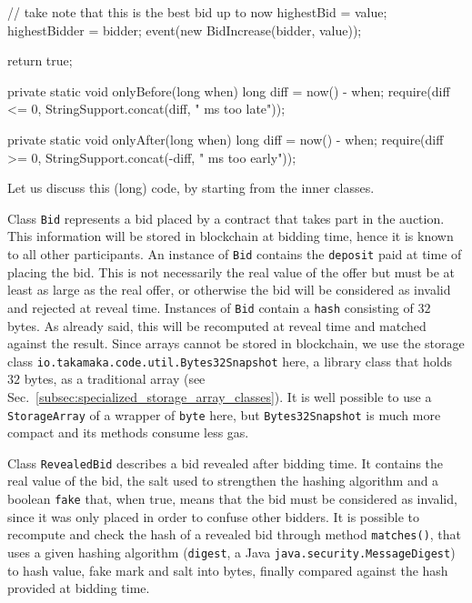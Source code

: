\begin{codebox}
\begin{javalst}
{{    // take note that this is the best bid up to now
    highestBid = value;
    highestBidder = bidder;
    event(new BidIncrease(bidder, value));

    return true;
  }

  private static void onlyBefore(long when) {
    long diff = now() - when;
    require(diff <= 0, StringSupport.concat(diff, " ms too late"));
  }

  private static void onlyAfter(long when) {
    long diff = now() - when;
    require(diff >= 0, StringSupport.concat(-diff, " ms too early"));
  }
}
\end{javalst}\end{codebox}

Let us discuss this (long) code, by starting from the inner classes.

Class \texttt{Bid} represents a bid placed by a contract that takes part in the auction.
This information will be stored in blockchain at bidding time, hence
it is known to all other participants. An instance of \texttt{Bid} contains
the \texttt{deposit} paid at time of placing the bid. This is not necessarily
the real value of the offer but must be at least as large as the real offer,
or otherwise the bid will be considered as invalid and rejected at reveal time. Instances
of \texttt{Bid} contain a \texttt{hash} consisting of $32$ bytes. As already said, this will
be recomputed at reveal time and matched against the result.
Since arrays cannot be stored in blockchain, we use the storage class
\texttt{io.takamaka.code.util.Bytes32Snapshot} here, a library class that holds $32$ bytes, as a
traditional array (see Sec.~\ref{subsec:specialized_storage_array_classes}).
It is well possible to use a \texttt{StorageArray} of a wrapper
of \texttt{byte} here, but \texttt{Bytes32Snapshot} is much more compact and its methods consume less gas.

Class \texttt{RevealedBid} describes a bid revealed after bidding time.
It contains the real value of the bid, the salt used to strengthen the
hashing algorithm and a boolean \texttt{fake} that, when true, means that the
bid must be considered as invalid, since it was only placed in order
to confuse other bidders. It is possible to recompute and check the hash of
a revealed bid through method \texttt{matches()}, that uses a given
hashing algorithm (\texttt{digest}, a Java \texttt{java.security.MessageDigest}) to
hash value, fake mark and salt into bytes, finally compared
against the hash provided at bidding time.

